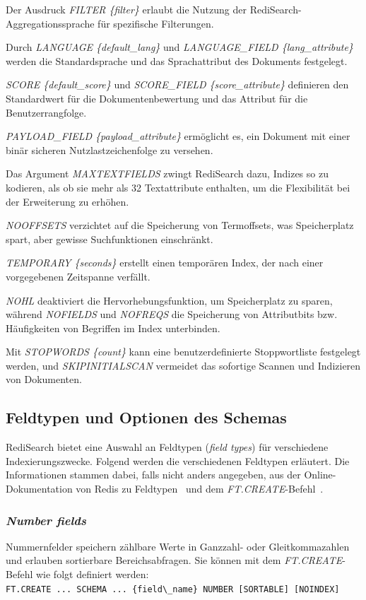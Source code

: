 Der Ausdruck \emph{FILTER \{filter\}} erlaubt die Nutzung der RediSearch-Aggregationssprache für spezifische Filterungen.

Durch \emph{LANGUAGE \{default\_lang\}} und \emph{LANGUAGE\_FIELD \{lang\_attribute\}} werden die Standardsprache und das Sprachattribut des Dokuments festgelegt.

\emph{SCORE \{default\_score\}} und \emph{SCORE\_FIELD \{score\_attribute\}} definieren den Standardwert für die Dokumentenbewertung und das Attribut für die Benutzerrangfolge.

\emph{PAYLOAD\_FIELD \{payload\_attribute\}} ermöglicht es, ein Dokument mit einer binär sicheren Nutzlastzeichenfolge zu versehen.

Das Argument \emph{MAXTEXTFIELDS} zwingt RediSearch dazu, Indizes so zu kodieren, als ob sie mehr als 32 Textattribute enthalten, um die Flexibilität bei der Erweiterung zu erhöhen.

\emph{NOOFFSETS} verzichtet auf die Speicherung von Termoffsets, was Speicherplatz spart, aber gewisse Suchfunktionen einschränkt.

\emph{TEMPORARY \{seconds\}} erstellt einen temporären Index, der nach einer vorgegebenen Zeitspanne verfällt.

\emph{NOHL} deaktiviert die Hervorhebungsfunktion, um Speicherplatz zu sparen, während \emph{NOFIELDS} und \emph{NOFREQS} die Speicherung von Attributbits bzw. Häufigkeiten von Begriffen im Index unterbinden.

Mit \emph{STOPWORDS \{count\}} kann eine benutzerdefinierte Stoppwortliste festgelegt werden, und \emph{SKIPINITIALSCAN} vermeidet das sofortige Scannen und Indizieren von Dokumenten.




\subsection{Feldtypen und Optionen des Schemas}\label{sec:redisearch-schema-fieldtypes}
RediSearch bietet eine Auswahl an Feldtypen (\emph{field types}) für verschiedene Indexierungszwecke. Folgend werden die verschiedenen Feldtypen erläutert. Die Informationen stammen dabei, falls nicht anders angegeben, aus der Online-Dokumentation von Redis zu Feldtypen~\cite{redis_ltd_field_nodate} und dem \emph{FT.CREATE}-Befehl~\cite{redis_ltd_ftcreate_nodate}.

\subsubsection{\emph{Number fields}}
Nummernfelder speichern zählbare Werte in Ganzzahl- oder Gleitkommazahlen und erlauben sortierbare Bereichsabfragen. Sie können mit dem \emph{FT.CREATE}-Befehl wie folgt definiert werden:\\
\lstinline|FT.CREATE ... SCHEMA ... {field\_name} NUMBER [SORTABLE] [NOINDEX]|

